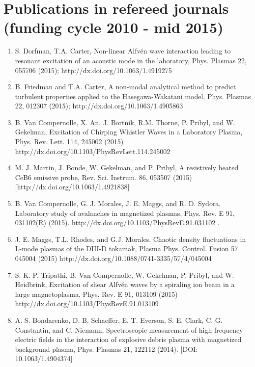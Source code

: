 \documentclass[11pt]{article}
\begin{document}
\section{Publications in refereed journals (funding cycle 2010 - mid 2015)}
 \begin{enumerate}

\item S. Dorfman, T.A. Carter, Non-linear Alfv\'{e}n wave interaction
  leading to resonant excitation of an acoustic mode in the
  laboratory, Phys. Plasmas  22, 055706 (2015);
  http://dx.doi.org/10.1063/1.4919275

\item B. Friedman and T.A. Carter, A non-modal analytical method to
  predict turbulent properties applied to the Hasegawa-Wakatani model,
  Phys. Plasmas 22, 012307 (2015); http://dx.doi.org/10.1063/1.4905863

\item B. Van Compernolle, X. An, J. Bortnik, R.M. Thorne, P. Pribyl, and W. Gekelman, Excitation of Chirping Whistler Waves in a Laboratory Plasma, Phys. Rev. Lett. 114, 245002 (2015) http://dx.doi.org/10.1103/PhysRevLett.114.245002

\item M. J. Martin, J. Bonde, W. Gekelman, and P. Pribyl, A resistively heated CeB6 emissive probe, Rev. Sci. Instrum. 86, 053507 (2015) [http://dx.doi.org/10.1063/1.4921838]

\item B. Van Compernolle, G. J. Morales, J. E. Maggs, and R. D. Sydora, Laboratory study of avalanches in magnetized plasmas, Phys. Rev. E 91, 031102(R) (2015). http://dx.doi.org/10.1103/PhysRevE.91.031102 .

\item J. E. Maggs, T.L. Rhodes, and G.J. Morales, Chaotic density fluctuations in L-mode plasmas of the DIII-D tokamak, Plasma Phys. Control. Fusion 57 045004 (2015) http://dx.doi.org/10.1088/0741-3335/57/4/045004

\item S. K. P. Tripathi, B. Van Compernolle, W. Gekelman, P. Pribyl, and W. Heidbrink, Excitation of shear Alfv\'{e}n waves by a spiraling ion beam in a large magnetoplasma, Phys. Rev. E  91, 013109 (2015) http://dx.doi.org/10.1103/PhysRevE.91.013109

\item   A. S. Bondarenko, D. B. Schaeffer, E. T. Everson, S. E. Clark, C. G. Constantin, and C. Niemann, Spectroscopic measurement of high-frequency electric fields in the interaction of explosive debris plasma with magnetized background plasma, Phys. Plasmas  21, 122112 (2014). [DOI: 10.1063/1.4904374]


\end{enumerate}
\end{document}
